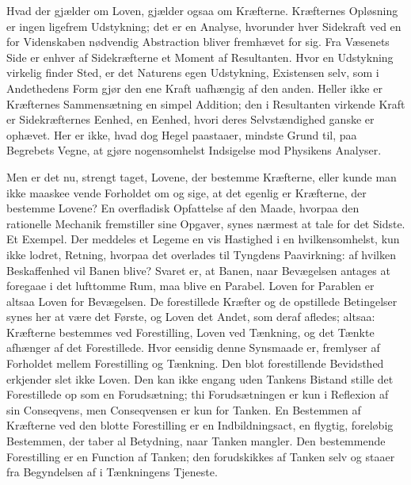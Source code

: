 \documentclass[12pt,a4paper]{book}
\begin{document}
Hvad der gjælder om Loven, gjælder ogsaa om Kræfterne. Kræfternes
Opløsning er ingen ligefrem Udstykning; det er en Analyse, hvorunder
hver Sidekraft ved en for Videnskaben nødvendig Abstraction bliver
fremhævet for sig. Fra Væsenets Side er enhver af Sidekræfterne et
Moment af Resultanten. Hvor en Udstykning virkelig finder Sted, er det
Naturens egen Udstykning, Existensen selv, som i Andethedens Form gjør
den ene Kraft uafhængig af den anden. Heller ikke er Kræfternes
Sammensætning en simpel Addition; den i Resultanten virkende Kraft er
Sidekræfternes Eenhed, en Eenhed, hvori deres Selvstændighed ganske er
ophævet. Her er ikke, hvad dog Hegel paastaaer, mindste Grund til, paa
Begrebets Vegne, at gjøre nogensomhelst Indsigelse mod Physikens
Analyser.

Men er det nu, strengt taget, Lovene, der bestemme
Kræfterne, eller kunde man ikke maaskee vende Forholdet om og sige, at
det egenlig er Kræfterne, der bestemme Lovene? En overfladisk
Opfattelse af den Maade, hvorpaa den rationelle Mechanik fremstiller
sine Opgaver, synes nærmest at tale for det Sidste. Et Exempel. Der
meddeles et Legeme en vis Hastighed i en hvilkensomhelst, kun ikke
lodret, Retning, hvorpaa det overlades til Tyngdens Paavirkning: af
hvilken Beskaffenhed vil Banen blive? Svaret er, at Banen, naar
Bevægelsen antages at foregaae i det lufttomme Rum, maa blive en
Parabel. Loven for Parablen er altsaa Loven for Bevægelsen. De
forestillede Kræfter og de opstillede Betingelser synes her at være det
Første, og Loven det Andet, som deraf afledes; altsaa: Kræfterne
bestemmes ved Forestilling, Loven ved Tænkning, og det Tænkte afhænger
af det Forestillede. Hvor eensidig denne Synsmaade er, fremlyser af
Forholdet mellem Forestilling og Tænkning. Den blot forestillende
Bevidsthed erkjender slet ikke Loven. Den kan ikke engang uden Tankens
Bistand stille det Forestillede op som en Forudsætning; thi
Forudsætningen er kun i Reflexion af sin Conseqvens, men Conseqvensen
er kun for Tanken. En Bestemmen af Kræfterne ved den blotte Forestilling
er en Indbildningsact, en flygtig, foreløbig Bestemmen, der taber al
Betydning, naar Tanken mangler. Den bestemmende Forestilling er en
Function af Tanken; den forudskikkes af Tanken selv og staaer fra
Begyndelsen af i Tænkningens Tjeneste.
\end{document}
